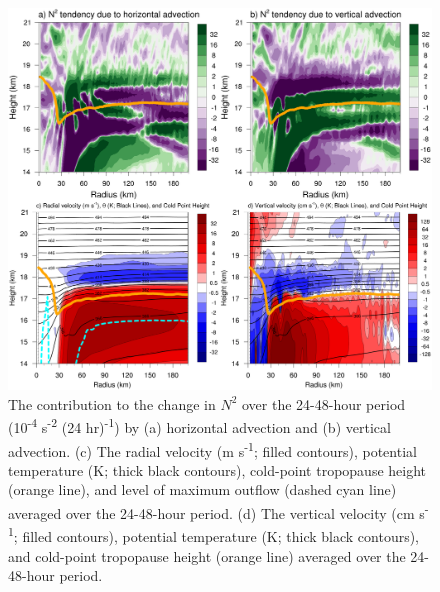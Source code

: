 \documentclass{ametsoc}
\begin{document}

\begin{figure}[ht]
\centerline{\includegraphics[width=39pc]{figures/h024-h048-adv.png}}
\caption{The contribution to the change in $N^2$ over the 24-48-hour period (10\textsuperscript{-4} s\textsuperscript{-2} (24 hr)\textsuperscript{-1}) by (a) horizontal advection and (b) vertical advection. (c) The radial velocity (m s\textsuperscript{-1}; filled contours), potential temperature (K; thick black contours), cold-point tropopause height (orange line), and level of maximum outflow (dashed cyan line) averaged over the 24-48-hour period. (d) The vertical velocity (cm s\textsuperscript{-1}; filled contours), potential temperature (K; thick black contours), and cold-point tropopause height (orange line) averaged over the 24-48-hour period.}
\label{fig:adv-24-48}
\end{figure}

\end{document}
